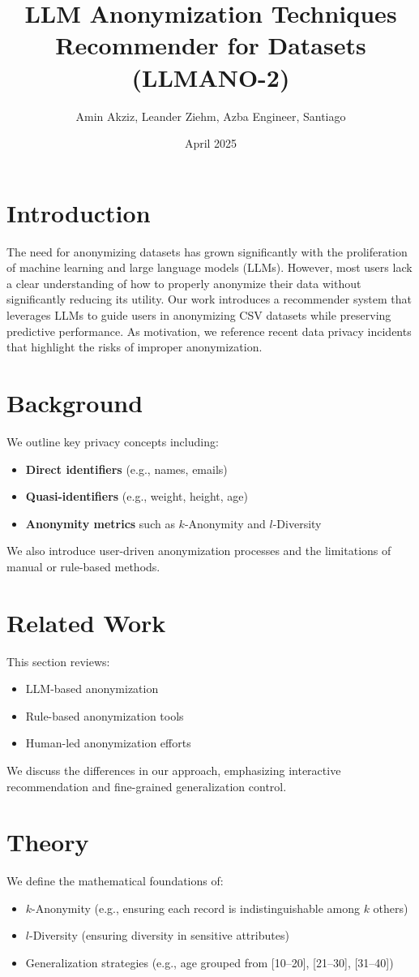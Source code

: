\documentclass{article}
\title{LLM Anonymization Techniques Recommender for Datasets (LLMANO-2)}
\author{Amin Akziz, Leander Ziehm, Azba Engineer, Santiago}
\date{April 2025}
\begin{document}
\maketitle

\section{Introduction}
The need for anonymizing datasets has grown significantly with the proliferation of machine learning and large language models (LLMs). However, most users lack a clear understanding of how to properly anonymize their data without significantly reducing its utility. Our work introduces a recommender system that leverages LLMs to guide users in anonymizing CSV datasets while preserving predictive performance. As motivation, we reference recent data privacy incidents that highlight the risks of improper anonymization.

\section{Background}
We outline key privacy concepts including:
\begin{itemize}
    \item \textbf{Direct identifiers} (e.g., names, emails)
    \item \textbf{Quasi-identifiers} (e.g., weight, height, age)
    \item \textbf{Anonymity metrics} such as $k$-Anonymity and $l$-Diversity
\end{itemize}
We also introduce user-driven anonymization processes and the limitations of manual or rule-based methods.

\section{Related Work}
This section reviews:
\begin{itemize}
    \item LLM-based anonymization
    \item Rule-based anonymization tools
    \item Human-led anonymization efforts
\end{itemize}
We discuss the differences in our approach, emphasizing interactive recommendation and fine-grained generalization control.

\section{Theory}
We define the mathematical foundations of:
\begin{itemize}
    \item $k$-Anonymity (e.g., ensuring each record is indistinguishable among $k$ others)
    \item $l$-Diversity (ensuring diversity in sensitive attributes)
    \item Generalization strategies (e.g., age grouped from [10--20], [21--30], [31--40])
\end{itemize}
\end{document}
